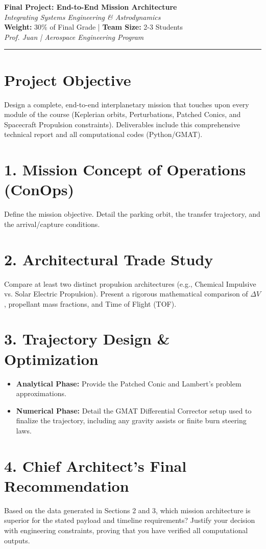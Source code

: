 \documentclass[11pt, letterpaper]{article}
\begin{document}
\begin{center}
    {\Large \textbf{Final Project: End-to-End Mission Architecture}} \\
    \vspace{0.2cm}
    {\large \textit{Integrating Systems Engineering \& Astrodynamics}} \\
    \vspace{0.4cm}
    \textbf{Weight:} 30\% of Final Grade | \textbf{Team Size:} 2-3 Students \\
    \textit{Prof. Juan | Aerospace Engineering Program}
\end{center}

\hrule
\vspace{0.5cm}

\section*{Project Objective}
Design a complete, end-to-end interplanetary mission that touches upon every module of the course (Keplerian orbits, Perturbations, Patched Conics, and Spacecraft Propulsion constraints). Deliverables include this comprehensive technical report and all computational codes (Python/GMAT).

\section*{1. Mission Concept of Operations (ConOps)}
Define the mission objective. Detail the parking orbit, the transfer trajectory, and the arrival/capture conditions. 

\section*{2. Architectural Trade Study}
Compare at least two distinct propulsion architectures (e.g., Chemical Impulsive vs. Solar Electric Propulsion). Present a rigorous mathematical comparison of $\Delta V$, propellant mass fractions, and Time of Flight (TOF). 

\section*{3. Trajectory Design \& Optimization}
\begin{itemize}
    \item \textbf{Analytical Phase:} Provide the Patched Conic and Lambert's problem approximations.
    \item \textbf{Numerical Phase:} Detail the GMAT Differential Corrector setup used to finalize the trajectory, including any gravity assists or finite burn steering laws.
\end{itemize}

\section*{4. Chief Architect's Final Recommendation}
Based on the data generated in Sections 2 and 3, which mission architecture is superior for the stated payload and timeline requirements? Justify your decision with engineering constraints, proving that you have verified all computational outputs.
\end{document}

